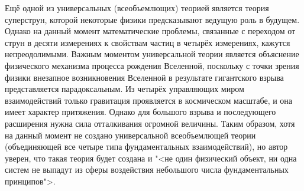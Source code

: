 \documentclass[exam_answers.tex]{subfiles}
\begin{document}
Ещё одной из универсальных (всеобъемлющих) теорией является теория суперструн, которой некоторые физики предсказывают ведущую роль в будущем.
Однако на данный момент математические проблемы, связанные с переходом от струн в десяти измерениях к свойствам частиц в четырёх измерениях, кажутся непреодолимыми.
Важным моментом универсальной теории является объяснение физического механизма процесса рождения Вселенной, поскольку с точки зрения физики внезапное возникновения Вселенной в результате гигантского взрыва представляется парадоксальным.  Из четырёх управляющих миром взаимодействий только гравитация проявляется в космическом масштабе, и она имеет характер притяжения.
Однако для большого взрыва и последующего расширения нужна сила отталкивания огромной величины.
Таким образом, хотя на данный момент не создано универсальной всеобъемлющей теории (объединяющей все четыре типа фундаментальных взаимодействий), но автор уверен, что такая теория будет создана и "<не один физический объект, ни одна систем не выпадут из сферы воздействия небольшого числа фундаментальных принципов">.
\end{document}
